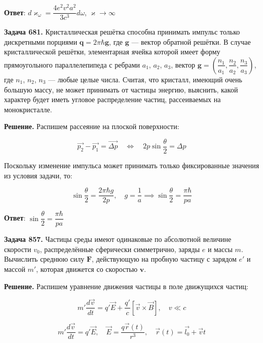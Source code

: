 \documentclass[a4paper,12pt]{article}
\begin{document}
	\quad \textbf{Ответ}: $d\varkappa_\omega = \dfrac{4e^2v^2 a^2}{3c^3}d\omega$, $\varkappa \to \infty$
	
	\quad \textbf{Задача 681.} Кристаллическая решётка способна принимать импульс только дискретными порциями $\mathbf{q} = 2\pi\hbar\mathbf{g}$, где $\mathbf{g}$ — вектор обратной решётки. В случае кристаллической решётки, элементарная ячейка которой имеет форму прямоугольного параллелепипеда с ребрами $a_1$, $a_2$, $a_3$, вектор $\mathbf{g} = \left( \dfrac{n_1}{a_1}, \dfrac{n_2}{a_2}, \dfrac{n_3}{a_3} \right)$, где $n_1$, $n_2$, $n_3$ — любые целые числа. Считая, что кристалл, имеющий очень большую массу, не может принимать от частицы энергию, выяснить, какой характер будет иметь угловое распределение частиц, рассеиваемых на монокристалле.
	
	\quad \textbf{Решение.} Распишем рассеяние на плоской поверхности:
	
	\begin{equation}
		\vec{p_2} - \vec{p_1} = \vec{\Delta p} \quad \Leftrightarrow \quad 2p\sin\dfrac{\theta}{2} = \Delta p
	\end{equation}
	
	\quad Поскольку изменение импульса может принимать только фиксированные значения из условия задачи, то: 

	\begin{equation}
		\sin\dfrac{\theta}{2} = \dfrac{2\pi \hbar g}{2p}, \quad g = \dfrac{1}{a} \implies \sin\dfrac{\theta}{2} = \dfrac{\pi \hbar}{pa}
	\end{equation}
	
	\quad \textbf{Ответ}: $\sin\dfrac{\theta}{2} = \dfrac{\pi \hbar}{pa}$
	
	\quad \textbf{Задача 857.} Частицы среды имеют одинаковые по абсолютной величине скорости $v_0$, распределённые сферически симметрично, заряды $e$ и массы $m$. Вычислить среднюю силу $\mathbf{F}$, действующую на пробную частицу с зарядом $e'$ и массой $m'$, которая движется со скоростью $\mathbf{v}$.
	
	\quad \textbf{Решение.} Распишем уравнение движения частицы в поле движущихся частиц: 
	
	\begin{equation}
		m' \dfrac{d\vec{v}}{dt} = q' \vec{E} + \dfrac{q'}{c} \left[\vec{v} \times \vec{B}\right], \quad v \ll c
	\end{equation}
	
	\begin{equation}
		m' \dfrac{d\vec{v}}{dt} = q'\vec{E}, \quad \vec{E} = \dfrac{q\vec{r}(t)}{r^3}, \quad \vec{r}(t) = \vec{l_0} + \vec{v} t 
	\end{equation}
	
\end{document}
